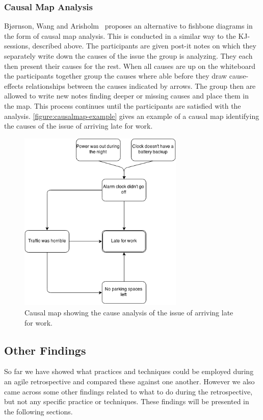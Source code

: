 \documentclass[12pt]{article}
\begin{document}
\subsubsection{Causal Map Analysis}
Bjørnson, Wang and Arisholm~\cite{Wang2012} proposes an alternative to fishbone diagrams in the form of causal map analysis. This is conducted in a similar way to the KJ-sessions, described above. The participants are given post-it notes on which they separately write down the causes of the issue the group is analyzing. They each then present their causes for the rest. When all causes are up on the whiteboard the participants together group the causes where able before they draw cause-effects relationships between the causes indicated by arrows. The group then are allowed to write new notes finding deeper or missing causes and place them in the map. This process continues until the participants are satisfied with the analysis. \autoref{figure:causalmap-example} gives an example of a causal map identifying the causes of the issue of arriving late for work.

\begin{figure}[h!]
	\centering
	\includegraphics[width=0.7\textwidth]{figures/causalmap-example.png}
	\caption{Causal map showing the cause analysis of the issue of arriving late for work.}
	\label{figure:causalmap-example}
\end{figure}

\subsection{Other Findings} 
So far we have showed what practices and techniques could be employed during an agile retrospective and compared these against one another. However we also came across some other findings related to what to do during the retrospective, but not any specific practice or techniques. These findings will be presented in the following sections. 
\end{document}
